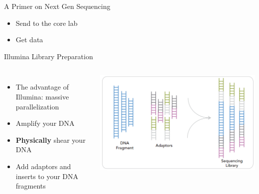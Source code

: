 \documentclass{beamer}
\begin{document}
\begin{frame}{A Primer on Next Gen Sequencing}
	\begin{itemize}
	\item Send to the core lab
	\item Get data
	\end{itemize}
\end{frame}

\begin{frame}{Illumina Library Preparation}
	\begin{columns}
			\begin{itemize}
			\item The advantage of Illumina: massive parallelization
			\item Amplify your DNA
			\item \textbf{Physically} shear your DNA
			\item Add adaptors and inserts to your DNA fragments
			\end{itemize}
			\includegraphics[width=\linewidth]{figures/illumina_library_prep.png}
	\end{columns}
\end{frame}
\end{document}
